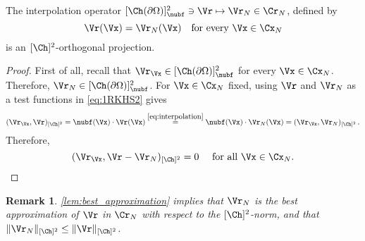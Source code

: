 \documentclass{siamart1116}
\newtheorem{remark}[theorem]{Remark}
\numberwithin{theorem}{section}
\begin{document}
\color{black}
\begin{lemma}\label{lem:best_approximation}
The interpolation operator $[\Ch(\partial \Omega)]^2_{\nubf}\ni\Vr\mapsto \Vr_N\in\Cr_N$,
defined by 
\begin{equation}\label{eq:interpolation}
\Vr(\Vx) = \Vr_N(\Vx) \quad \text{for every } \Vx\in\Cx_N
\end{equation}
is an $[\Ch]^2$-orthogonal projection.
\end{lemma}
\begin{proof}
First of all, recall that $\Vr_{\Vx}\in[\Ch(\partial \Omega)]^2_{\nubf}$ for every $\Vx\in\Cx_N$.
Therefore, $\Vr_N \in [\Ch(\partial \Omega)]^2_{\nubf}$. For $\Vx\in \Cx_N$ fixed, using $\Vr$ and $\Vr_N$ as a test functions in \cref{eq:1RKHS2}
gives
\begin{equation}
(\Vr_\Vx,\Vr)_{[\Ch]^2} = \nubf(\Vx)\cdot \Vr(\Vx) \stackrel{\cref{eq:interpolation}}{=} 
\nubf(\Vx)\cdot\Vr_N(\Vx) = (\Vr_\Vx,\Vr_N)_{[\Ch]^2}\,.
\end{equation}
Therefore,
\begin{equation}\label{eq:orthogonality}
(\Vr_\Vx, \Vr-\Vr_N)_{[\Ch]^2}=0 \quad \text{ for all } \Vx\in \Cx_N.
\end{equation}
\end{proof}
\begin{remark}\label{rmk:best_approximation}
\cref{lem:best_approximation} implies that $\Vr_N$ is the best approximation
of $\Vr$ in $\Cr_N$ with respect to the $[\Ch]^2$-norm,
and that $\Vert \Vr_N \Vert_{[\Ch]^2} \leq \Vert \Vr\Vert_{[\Ch]^2}$.
\end{remark}
\end{document}
